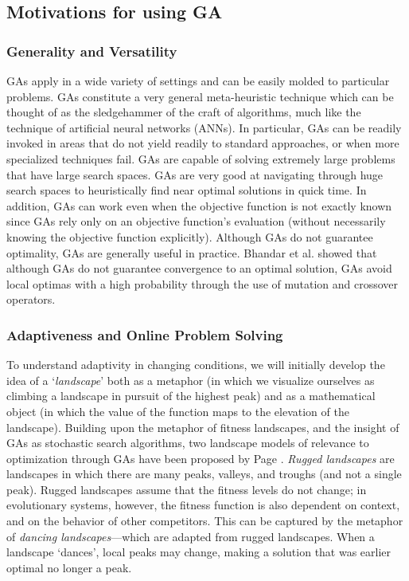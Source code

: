 \documentclass[journal]{IEEEtran}
\begin{document}
\subsection{Motivations for using GA} 

\vspace{2mm}
\subsubsection{Generality and Versatility} 

GAs apply in a wide variety of settings and can be easily molded to particular problems. GAs constitute a very general meta-heuristic technique which can be thought of as the sledgehammer of the craft of algorithms, much like the technique of artificial neural networks (ANNs). In particular, GAs can be readily invoked in areas that do not yield readily to standard approaches, or when more specialized techniques fail. GAs are capable of solving extremely large problems that have large search spaces. GAs are very good at navigating through huge search spaces to heuristically find near optimal solutions in quick time. In addition, GAs can work even when the objective function is not exactly known since GAs rely only on an objective function's evaluation (without necessarily knowing the objective function explicitly). Although GAs do not guarantee optimality, GAs are generally useful in practice. Bhandar et al. \cite{bhandari1996genetic} showed that although GAs do not guarantee convergence to an optimal solution, GAs avoid local optimas with a high probability through the use of mutation and crossover operators. 

\vspace{2mm}
\subsubsection{Adaptiveness and Online Problem Solving} 

To understand adaptivity in changing conditions, we will initially develop the idea of a `\textit{landscape}' both as a metaphor (in which we visualize ourselves as climbing a landscape in pursuit of the highest peak) and as a mathematical object (in which the value of the function maps to the elevation of the landscape). Building upon the metaphor of fitness landscapes, and the insight of GAs as stochastic search algorithms, two landscape models of relevance to optimization through GAs have been proposed by Page \cite{page2010diversity}. \emph{Rugged landscapes} are landscapes in which there are many peaks, valleys, and troughs (and not a single peak). Rugged landscapes assume that the fitness levels do not change; in evolutionary systems, however, the fitness function is also dependent on context, and on the behavior of other competitors. This can be captured by the metaphor of \emph{dancing landscapes}---which are adapted from rugged landscapes. When a landscape `dances', local peaks may change, making a solution that was earlier optimal no longer a peak. 
\end{document}
